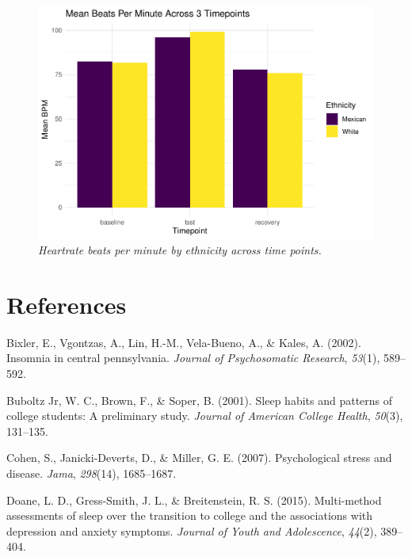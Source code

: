 \documentclass[man, fleqn, noextraspace]{apa6}
\begin{document}
\begin{figure}
\centering
\includegraphics{PAPAJA_Final_class_project_files/figure-latex/unnamed-chunk-3-1.pdf}
\caption{\label{fig:unnamed-chunk-3}\emph{Heartrate beats per minute by ethnicity across time points.}}
\end{figure}

\hypertarget{references}{%
\section{References}\label{references}}

\begingroup
\setlength{\parindent}{-0.5in}
\setlength{\leftskip}{0.5in}

\hypertarget{refs}{}
\leavevmode\hypertarget{ref-bixler2002insomnia}{}%
Bixler, E., Vgontzas, A., Lin, H.-M., Vela-Bueno, A., \& Kales, A. (2002). Insomnia in central pennsylvania. \emph{Journal of Psychosomatic Research}, \emph{53}(1), 589--592.

\leavevmode\hypertarget{ref-buboltz2001sleep}{}%
Buboltz Jr, W. C., Brown, F., \& Soper, B. (2001). Sleep habits and patterns of college students: A preliminary study. \emph{Journal of American College Health}, \emph{50}(3), 131--135.

\leavevmode\hypertarget{ref-cohen2007_psych}{}%
Cohen, S., Janicki-Deverts, D., \& Miller, G. E. (2007). Psychological stress and disease. \emph{Jama}, \emph{298}(14), 1685--1687.

\leavevmode\hypertarget{ref-doane2015multi}{}%
Doane, L. D., Gress-Smith, J. L., \& Breitenstein, R. S. (2015). Multi-method assessments of sleep over the transition to college and the associations with depression and anxiety symptoms. \emph{Journal of Youth and Adolescence}, \emph{44}(2), 389--404.
\end{document}
